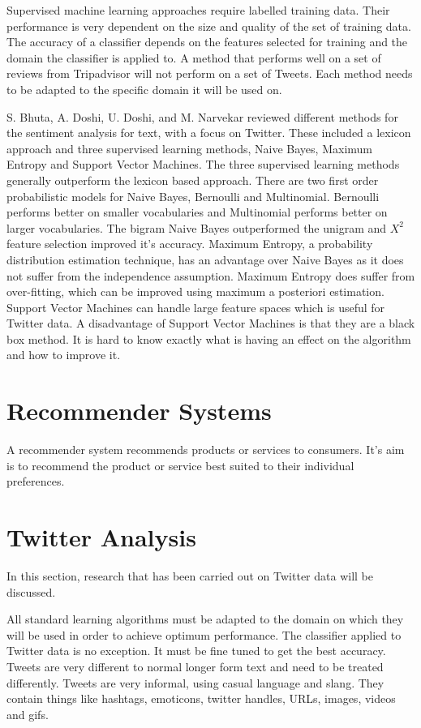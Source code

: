 Supervised machine learning approaches require labelled training data. Their performance is very dependent on the size and quality of the set of training data. The accuracy of a classifier depends on the features selected for training and the domain the classifier is applied to. A method that performs well on a set of reviews from Tripadvisor will not perform on a set of Tweets. Each method needs to be adapted to the specific domain it will be used on.

S. Bhuta, A. Doshi, U. Doshi, and M. Narvekar \cite{Bhuta2014} reviewed different methods for the sentiment analysis for text, with a focus on Twitter. These included a lexicon approach and three supervised learning methods, Naive Bayes, Maximum Entropy and Support Vector Machines. The three supervised learning methods generally outperform the lexicon based approach. There are two first order probabilistic models for Naive Bayes, Bernoulli and Multinomial. Bernoulli performs better on smaller vocabularies and Multinomial performs better on larger vocabularies. The bigram Naive Bayes outperformed the unigram and ${X}^2$ feature selection improved it's accuracy. Maximum Entropy, a probability distribution estimation technique, has an advantage over Naive Bayes as it does not suffer from the independence assumption. Maximum Entropy does suffer from over-fitting, which can be improved using maximum a posteriori estimation. Support Vector Machines can handle large feature spaces which is useful for Twitter data. A disadvantage of Support Vector Machines is that they are a black box method. It is hard to know exactly what is having an effect on the algorithm and how to improve it.

\section{Recommender Systems}

A recommender system recommends products or services to consumers. It's aim is to recommend the product or service best suited to their individual preferences.

\section{Twitter Analysis}

In this section, research that has been carried out on Twitter data will be discussed.

All standard learning algorithms must be adapted to the domain on which they will be used in order to achieve optimum performance. The classifier applied to Twitter data is no exception. It must be fine tuned to get the best accuracy. Tweets are very different to normal longer form text and need to be treated differently. Tweets are very informal, using casual language and slang. They contain things like hashtags, emoticons, twitter handles, URLs, images, videos and gifs.

